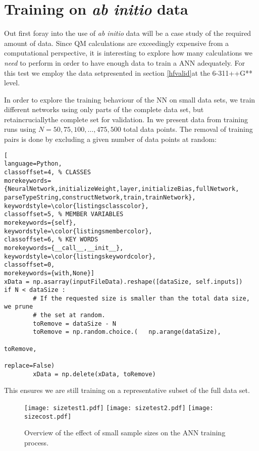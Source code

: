 \documentclass[../../master.tex]{subfiles}
\begin{document}
\section{Training on \emph{ab initio} data}
Out first foray into the use of \emph{ab initio} data will be a case study of the required amount of data. Since QM calculations are exceedingly expensive from a computational perspective, it is interesting to explore how many calculations we \emph{need} to perform in order to have enough data to train a ANN adequately. For this test we employ the  data set\textemdash  presented in section \ref{hfvalid}\textemdash at the 6-311++G** level. 

In order to explore the training behaviour of the NN on small data sets, we train different networks using only parts of the complete data set, but retain\textemdash crucially\textemdash the complete set for validation. In  we present data from training runs using $N=50,75,100,\dots,475,500$ total data points. The removal of training pairs is done by excluding a given number of data points at random:
\begin{lstlisting}[
language=Python,
classoffset=4, % CLASSES
morekeywords={NeuralNetwork,initializeWeight,layer,initializeBias,fullNetwork, parseTypeString,constructNetwork,train,trainNetwork},
keywordstyle=\color{listingsclasscolor},
classoffset=5, % MEMBER VARIABLES
morekeywords={self},
keywordstyle=\color{listingsmembercolor},
classoffset=6, % KEY WORDS
morekeywords={__call__,__init__},
keywordstyle=\color{listingskeywordcolor},
classoffset=0,
morekeywords={with,None}]
xData = np.asarray(inputFileData).reshape([dataSize, self.inputs])
if N < dataSize :
		# If the requested size is smaller than the total data size, we prune
		# the set at random.
		toRemove = dataSize - N
		toRemove = np.random.choice.(	np.arange(dataSize), 
																	toRemove, 
																	replace=False)
		xData = np.delete(xData, toRemove)
\end{lstlisting}
This ensures we are still training on a representative subset of the full data set. 

\begin{figure}
\centering
\texttt{[image: sizetest1.pdf]}
\texttt{[image: sizetest2.pdf]}
\texttt{[image: sizecost.pdf]}
\caption{Overview of the effect of small sample sizes on the ANN training process. \label{fig:sizes}}
\end{figure}
\end{document}
